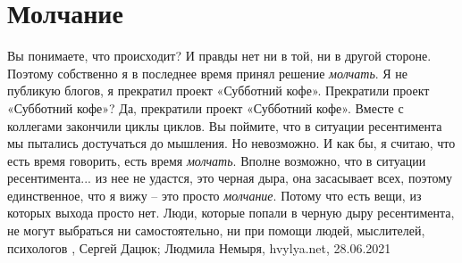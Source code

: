  
 
 
 
 
\chapter{Молчание}
\label{sec:slova.molchanie}

Вы понимаете, что происходит? И правды нет ни в той, ни в другой стороне.
Поэтому собственно я в последнее время принял решение \emph{молчать}. Я не публикую
блогов, я прекратил проект «Субботний кофе».  Прекратили проект «Субботний
кофе»?  Да, прекратили проект «Субботний кофе». Вместе с коллегами закончили
циклы циклов. Вы поймите, что в ситуации ресентимента мы пытались достучаться
до мышления. Но невозможно. И как бы, я считаю, что есть время говорить, есть
время \emph{молчать}. Вполне возможно, что в ситуации ресентимента... из нее не удастся,
это черная дыра, она засасывает всех, поэтому единственное, что я вижу – это
просто \emph{молчание}. Потому что есть вещи, из которых выхода просто нет. Люди,
которые попали в черную дыру ресентимента, не могут выбраться ни
самостоятельно, ни при помощи людей, мыслителей, психологов
, 
Сергей Дацюк; Людмила Немыря, hvylya.net, 28.06.2021

